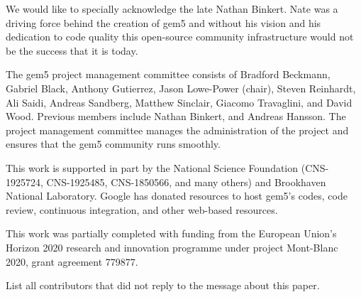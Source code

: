 \documentclass[acmlarge,nonacm,screen=true]{acmart}
\begin{document}
We would like to specially acknowledge the late Nathan Binkert.
Nate was a driving force behind the creation of gem5 and without his vision and his dedication to code quality this open-source community infrastructure would not be the success that it is today.

The gem5 project management committee consists of Bradford Beckmann, Gabriel Black, Anthony Gutierrez, Jason Lowe-Power (chair), Steven Reinhardt, Ali Saidi, Andreas Sandberg, Matthew Sinclair, Giacomo Travaglini, and David Wood.
Previous members include Nathan Binkert, and Andreas Hansson.
The project management committee manages the administration of the project and ensures that the gem5 community runs smoothly.

This work is supported in part by the National Science Foundation (CNS-1925724, CNS-1925485, CNS-1850566, and many others) and Brookhaven National Laboratory.
Google has donated resources to host gem5's codes, code review, continuous integration, and other web-based resources.

This work was partially completed with funding from the European Union's Horizon 2020 research and innovation programme under project Mont-Blanc 2020, grant agreement 779877.

List all contributors that did not reply to the message about this paper.



\end{document}
